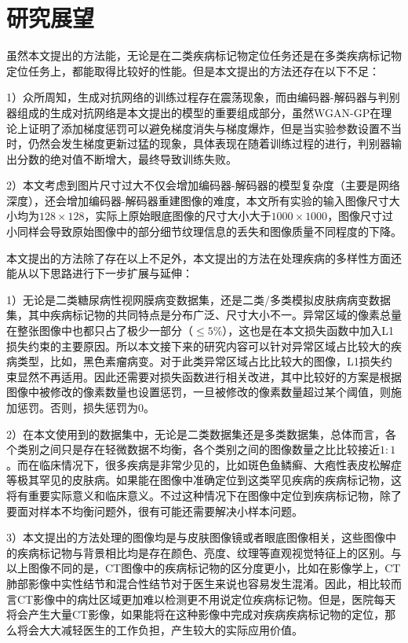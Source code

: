 \section{研究展望}
虽然本文提出的方法能，无论是在二类疾病标记物定位任务还是在多类疾病标记物定位任务上，都能取得比较好的性能。但是本文提出的方法还存在以下不足：

1）众所周知，生成对抗网络的训练过程存在震荡现象，而由编码器-解码器与判别器组成的生成对抗网络是本文提出的模型的重要组成部分，虽然WGAN-GP在理论上证明了添加梯度惩罚可以避免梯度消失与梯度爆炸，但是当实验参数设置不当时，仍然会发生梯度更新过猛的现象，具体表现在随着训练过程的进行，判别器输出分数的绝对值不断增大，最终导致训练失败。

2）本文考虑到图片尺寸过大不仅会增加编码器-解码器的模型复杂度（主要是网络深度），还会增加编码器-解码器重建图像的难度，本文所有实验的输入图像尺寸大小均为$128\times 128$，实际上原始眼底图像的尺寸大小大于$1000\times 1000$，图像尺寸过小同样会导致原始图像中的部分细节纹理信息的丢失和图像质量不同程度的下降。

本文提出的方法除了存在以上不足外，本文提出的方法在处理疾病的多样性方面还能从以下思路进行下一步扩展与延伸：

1）无论是二类糖尿病性视网膜病变数据集，还是二类/多类模拟皮肤病病变数据集，其中疾病标记物的共同特点是分布广泛、尺寸大小不一。异常区域的像素总量在整张图像中也都只占了极少一部分（$\le 5\%$），这也是在本文损失函数中加入L1损失约束的主要原因。所以本文接下来的研究内容可以针对异常区域占比较大的疾病类型，比如，黑色素瘤病变。对于此类异常区域占比比较大的图像，L1损失约束显然不再适用。因此还需要对损失函数进行相关改进，其中比较好的方案是根据图像中被修改的像素数量也设置惩罚，一旦被修改的像素数量超过某个阈值，则施加惩罚。否则，损失惩罚为$0$。

2）在本文使用到的数据集中，无论是二类数据集还是多类数据集，总体而言，各个类别之间只是存在轻微数据不均衡，各个类别之间的图像数量之比比较接近$1:1$。而在临床情况下，很多疾病是非常少见的，比如斑色鱼鳞癣、大疱性表皮松解症等极其罕见的皮肤病。如果能在图像中准确定位到这类罕见疾病的疾病标记物，这将有重要实际意义和临床意义。不过这种情况下在图像中定位到疾病标记物，除了要面对样本不均衡问题外，很有可能还需要解决小样本问题。

3）本文提出的方法处理的图像均是与皮肤图像镜或者眼底图像相关，这些图像中的疾病标记物与背景相比均是存在颜色、亮度、纹理等直观视觉特征上的区别。与以上图像不同的是，CT图像中的疾病标记物的区分度更小，比如在影像学上，CT肺部影像中实性结节和混合性结节对于医生来说也容易发生混淆。因此，相比较而言CT影像中的病灶区域更加难以检测更不用说定位疾病标记物。但是，医院每天将会产生大量CT影像，如果能将在这种影像中完成对疾病疾病标记物的定位，那么将会大大减轻医生的工作负担，产生较大的实际应用价值。
